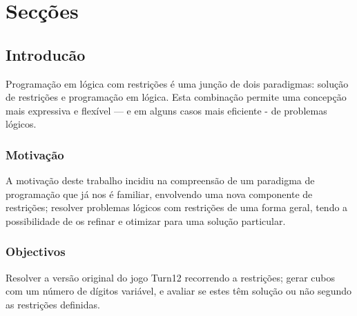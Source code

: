 %
%



\chapter{Secções}
\label{cont}


\section{Introducão}
\label{introduction} %

Programação em lógica com restrições é uma junção de dois paradigmas: solução de restrições e programação em lógica. Esta combinação permite uma concepção mais expressiva e flexível — e em alguns casos mais eficiente - de problemas lógicos.




\subsection{Motivação}
\label{sec:1}
A motivação deste trabalho incidiu na compreensão de um paradigma de programação que já nos é familiar, envolvendo uma nova componente de restrições; resolver problemas lógicos com restrições de uma forma geral, tendo a possibilidade de os refinar e otimizar para uma solução particular.




\subsection{Objectivos}
\label{sec:2}
Resolver a versão original do jogo Turn12 recorrendo a restrições; gerar cubos com um número de dígitos variável, e avaliar se estes têm solução ou não segundo as restrições definidas.



